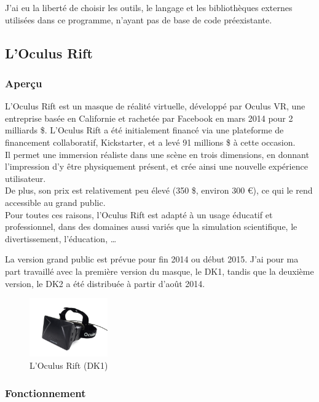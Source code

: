 \documentclass[a4paper,french,12pt]{article}
\begin{document}
		J'ai eu la liberté de choisir les outils, le langage et les bibliothèques  externes utilisées dans ce programme,
		n'ayant pas de base de code préexistante.
		
	
	\subsection{L'Oculus Rift}
		
		\subsubsection{Aperçu}
		  L'Oculus Rift est un masque de réalité virtuelle, développé par Oculus VR, une entreprise 
		  basée en Californie et rachetée par Facebook en mars 2014 pour  2 milliards \$.
		  L'Oculus Rift a été initialement financé via une plateforme de financement collaboratif, Kickstarter,
		  et a levé 91 millions \$ à cette occasion. \\
		  Il permet une immersion  réaliste dans une scène en trois dimensions, en donnant l'impression d'y être physiquement
		  présent, et crée ainsi une nouvelle expérience
		  utilisateur. \\
		  De plus, son prix est relativement peu élevé (350 \$, environ 300 \euro), ce qui le rend accessible au grand public. \\
		  Pour toutes ces raisons, l'Oculus Rift est adapté à un usage éducatif et professionnel, dans des domaines aussi variés
		  que la simulation scientifique, le divertissement, l'éducation, \ldots
		  
		  La version grand public est prévue pour fin 2014 ou début 2015. J'ai pour ma part travaillé avec la première
		  version du masque, le DK1, tandis que la deuxième version, le DK2 a été distribuée à partir d'août 2014.
		  \FloatBarrier
		  \begin{figure}[h!]
		    \centering
		      \includegraphics[width=0.3\textwidth]{dk1.jpg}
		    \caption{L'Oculus Rift (DK1)}
		  \end{figure}
		  \FloatBarrier
		  \subsubsection{Fonctionnement}
		  
\end{document}

